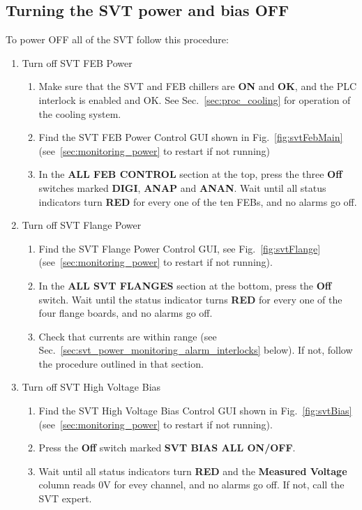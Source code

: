 \documentclass[12pt]{report}
\begin{document}
\subsection{Turning the SVT power and bias OFF}
\label{sec:proc_voltages_alloff}
To power OFF all of the SVT follow this procedure:
\begin{enumerate}
\item Turn off SVT FEB Power
\begin{enumerate}
\item 
Make sure that the SVT and FEB chillers are \textbf{ON} and \textbf{OK}, and the PLC interlock is enabled and OK. See Sec.~\ref{sec:proc_cooling} for operation of the cooling system.
\item
Find the SVT FEB Power Control GUI shown in Fig.~\ref{fig:svtFebMain} (see~\ref{sec:monitoring_power} to restart if not running)
\item
In the \textbf{ALL FEB CONTROL} section at the top, press the three \textbf{Off} switches marked \textbf{DIGI}, \textbf{ANAP} and \textbf{ANAN}.
Wait until all status indicators turn \textbf{RED} for every one of the ten FEBs, and no alarms go off.
\end{enumerate}

\item Turn off SVT Flange Power
\begin{enumerate}
\item
Find the SVT Flange Power Control GUI, see Fig.~\ref{fig:svtFlange}  (see~\ref{sec:monitoring_power} to restart if not running).
\item
In the \textbf{ALL SVT FLANGES} section at the bottom, press the \textbf{Off} switch.
Wait until the status indicator turns \textbf{RED} for every one of the four flange boards, and no alarms go off.
\item
Check that currents are within range (see Sec.~\ref{sec:svt_power_monitoring_alarm_interlocks} below). If not, follow the procedure outlined in that section.
\end{enumerate}

\item Turn off SVT High Voltage Bias
\begin{enumerate}
\item
Find the SVT High Voltage Bias Control GUI shown in Fig.~\ref{fig:svtBias} (see~\ref{sec:monitoring_power} to restart if not running).
\item
Press the \textbf{Off} switch marked \textbf{SVT BIAS ALL ON/OFF}.
\item
Wait until all status indicators turn \textbf{RED} and the \textbf{Measured Voltage} column reads 0V for evey channel, and no alarms go off.
If not, call the SVT expert.
\end{enumerate}

\end{enumerate}
\end{document}
